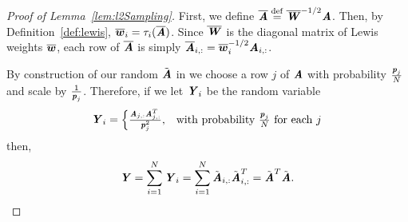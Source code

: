 \begin{proof}[Proof of Lemma~\ref{lem:l2Sampling}]
	First, we define $\barA \defeq \LW^{-1/2}\AA$.
	Then, by Definition~\ref{def:lewis}, $\lw_i = \tau_i(\barA)$.
	Since $\LW$ is the diagonal matrix of Lewis weights $\lw$,
	each row of $\barA$ is simply $\barA_{i,:} = \lw_i^{-1/2} \AA_{i,:}$.
	
	By construction of our random $\tilde{\AA}$ in  we choose a row $j$ of $\AA$ with probability $\frac{\pp_j}{N}$ and scale by $\frac{1}{\pp_j}$. Therefore, if we let $\YY_i$ be the random variable
	\[
	\YY_i = 
	\begin{cases}
	\frac{\AA_{j,:}\AA_{j,:}^T}{\pp_j^2},& \text{with probability } \frac{\pp_j}{N} \text{ for each } j
	\end{cases}
	\]
then,
	\[
	\YY = \sum_{i=1}^N \YY_i = \sum_{i=1}^N \tilde{\AA}_{i,:}\tilde{\AA}_{i,:}^T = \tilde{\AA}^T\tilde{\AA}.
	\]
	

\end{proof}
